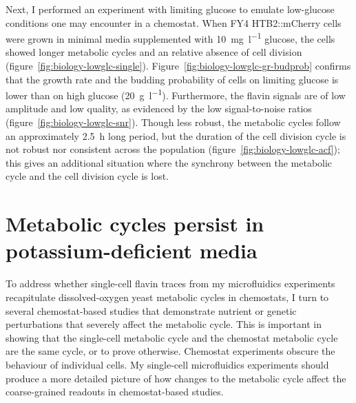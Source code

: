 Next, I performed an experiment with limiting glucose to emulate low-glucose conditions one may encounter in a chemostat.
When FY4 HTB2::mCherry cells were grown in minimal media supplemented with \SI{10}{\milli\gram~\litre^{-1}} glucose, the cells showed longer metabolic cycles and an relative absence of cell division (figure~\ref{fig:biology-lowglc-single}).
Figure~\ref{fig:biology-lowglc-gr-budprob} confirms that the growth rate and the budding probability of cells on limiting glucose is lower than on high glucose (\SI{20}{\gram~\litre^{-1}}).
Furthermore, the flavin signals are of low amplitude and low quality, as evidenced by the low signal-to-noise ratios (figure~\ref{fig:biology-lowglc-snr}).
Though less robust, the metabolic cycles follow an approximately \SI{2.5}{\hour} long period, but the duration of the cell division cycle is not robust nor consistent across the population (figure~\ref{fig:biology-lowglc-acf}); this gives an additional situation where the synchrony between the metabolic cycle and the cell division cycle is lost.




\section{Metabolic cycles persist in potassium-deficient media}
\label{sec:biology-potassium_deficient}

To address whether single-cell flavin traces from my microfluidics experiments recapitulate dissolved-oxygen yeast metabolic cycles in chemostats, I turn to several chemostat-based studies that demonstrate nutrient or genetic perturbations that severely affect the metabolic cycle.
This is important in showing that the single-cell metabolic cycle and the chemostat metabolic cycle are the same cycle, or to prove otherwise.
Chemostat experiments obscure the behaviour of individual cells.
My single-cell microfluidics experiments should produce a more detailed picture of how changes to the metabolic cycle affect the coarse-grained readouts in chemostat-based studies.

